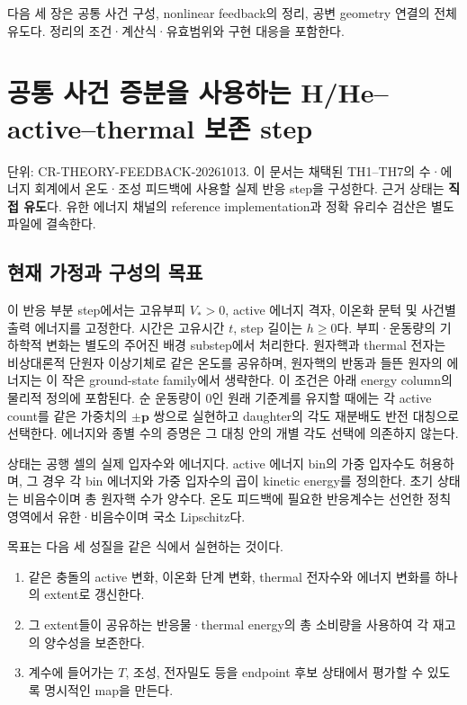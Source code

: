 다음 세 장은 공통 사건 구성, nonlinear feedback의 정리, 공변 geometry 연결의 전체 유도다. 정리의 조건·계산식·유효범위와 구현 대응을 포함한다.

\clearpage

\hypertarget{uxacf5uxd1b5-uxc0acuxac74-uxc99duxbd84uxc744-uxc0acuxc6a9uxd558uxb294-hheactivethermal-uxbcf4uxc874-step}{%
\section{공통 사건 증분을 사용하는 H/He--active--thermal 보존 step}\label{uxacf5uxd1b5-uxc0acuxac74-uxc99duxbd84uxc744-uxc0acuxc6a9uxd558uxb294-hheactivethermal-uxbcf4uxc874-step}}

단위: CR-THEORY-FEEDBACK-20261013. 이 문서는 채택된 TH1--TH7의 수·에너지 회계에서 온도·조성 피드백에 사용할 실제 반응 step을 구성한다. 근거 상태는 \textbf{직접 유도}다. 유한 에너지 채널의 reference implementation과 정확 유리수 검산은 별도 파일에 결속한다.

\hypertarget{uxd604uxc7ac-uxac00uxc815uxacfc-uxad6cuxc131uxc758-uxbaa9uxd45c}{%
\subsection{현재 가정과 구성의 목표}\label{uxd604uxc7ac-uxac00uxc815uxacfc-uxad6cuxc131uxc758-uxbaa9uxd45c}}

이 반응 부분 step에서는 고유부피 \(V_*>0\), active 에너지 격자, 이온화 문턱 및 사건별 출력 에너지를 고정한다. 시간은 고유시간 \(t\), step 길이는 \(h\ge0\)다. 부피·운동량의 기하학적 변화는 별도의 주어진 배경 substep에서 처리한다. 원자핵과 thermal 전자는 비상대론적 단원자 이상기체로 같은 온도를 공유하며, 원자핵의 반동과 들뜬 원자의 에너지는 이 작은 ground-state family에서 생략한다. 이 조건은 아래 energy column의 물리적 정의에 포함된다. 순 운동량이 0인 원래 기준계를 유지할 때에는 각 active count를 같은 가중치의 \(\pm\boldsymbol p\) 쌍으로 실현하고 daughter의 각도 재분배도 반전 대칭으로 선택한다. 에너지와 종별 수의 증명은 그 대칭 안의 개별 각도 선택에 의존하지 않는다.

상태는 공행 셀의 실제 입자수와 에너지다. active 에너지 bin의 가중 입자수도 허용하며, 그 경우 각 bin 에너지와 가중 입자수의 곱이 kinetic energy를 정의한다. 초기 상태는 비음수이며 총 원자핵 수가 양수다. 온도 피드백에 필요한 반응계수는 선언한 정칙 영역에서 유한·비음수이며 국소 Lipschitz다.

목표는 다음 세 성질을 같은 식에서 실현하는 것이다.

\begin{enumerate}
\def\labelenumi{\arabic{enumi}.}
\tightlist
\item
  같은 충돌의 active 변화, 이온화 단계 변화, thermal 전자수와 에너지 변화를 하나의 extent로 갱신한다.
\item
  그 extent들이 공유하는 반응물·thermal energy의 총 소비량을 사용하여 각 재고의 양수성을 보존한다.
\item
  계수에 들어가는 \(T\), 조성, 전자밀도 등을 endpoint 후보 상태에서 평가할 수 있도록 명시적인 map을 만든다.
\end{enumerate}

